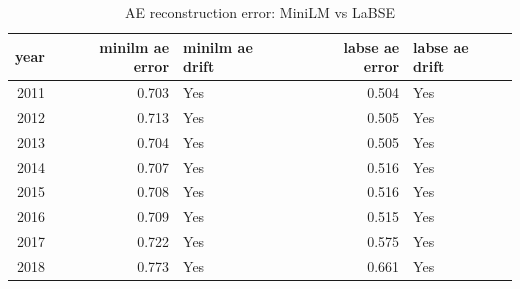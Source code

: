 \begin{table}[ht]
\centering
\caption{AE reconstruction error: MiniLM vs LaBSE}
\label{tab:minilm_vs_labse_ae}
\begin{tabular}{rrlrl}
\toprule
year & minilm ae error & minilm ae drift & labse ae error & labse ae drift \\
\midrule
2011 & 0.703 & Yes & 0.504 & Yes \\
2012 & 0.713 & Yes & 0.505 & Yes \\
2013 & 0.704 & Yes & 0.505 & Yes \\
2014 & 0.707 & Yes & 0.516 & Yes \\
2015 & 0.708 & Yes & 0.516 & Yes \\
2016 & 0.709 & Yes & 0.515 & Yes \\
2017 & 0.722 & Yes & 0.575 & Yes \\
2018 & 0.773 & Yes & 0.661 & Yes \\
\bottomrule
\end{tabular}
\end{table}
